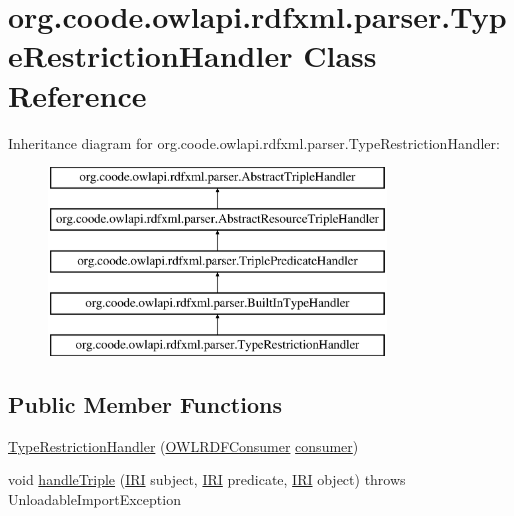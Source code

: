 \hypertarget{classorg_1_1coode_1_1owlapi_1_1rdfxml_1_1parser_1_1_type_restriction_handler}{\section{org.\-coode.\-owlapi.\-rdfxml.\-parser.\-Type\-Restriction\-Handler Class Reference}
\label{classorg_1_1coode_1_1owlapi_1_1rdfxml_1_1parser_1_1_type_restriction_handler}
}
Inheritance diagram for org.\-coode.\-owlapi.\-rdfxml.\-parser.\-Type\-Restriction\-Handler\-:\begin{figure}[H]
\begin{center}
\leavevmode
\includegraphics[height=5.000000cm]{classorg_1_1coode_1_1owlapi_1_1rdfxml_1_1parser_1_1_type_restriction_handler}
\end{center}
\end{figure}
\subsection*{Public Member Functions}
\begin{DoxyCompactItemize}
\item 
\hyperlink{classorg_1_1coode_1_1owlapi_1_1rdfxml_1_1parser_1_1_type_restriction_handler_a5f8f75bbf0d9b4a1b1745cfe0a914555}{Type\-Restriction\-Handler} (\hyperlink{classorg_1_1coode_1_1owlapi_1_1rdfxml_1_1parser_1_1_o_w_l_r_d_f_consumer}{O\-W\-L\-R\-D\-F\-Consumer} \hyperlink{classorg_1_1coode_1_1owlapi_1_1rdfxml_1_1parser_1_1_abstract_triple_handler_a4ccf4d898ff01eb1cadfa04b23d54e9c}{consumer})
\item 
void \hyperlink{classorg_1_1coode_1_1owlapi_1_1rdfxml_1_1parser_1_1_type_restriction_handler_a0329bf26bd475f41f5cbb73c424eeb34}{handle\-Triple} (\hyperlink{classorg_1_1semanticweb_1_1owlapi_1_1model_1_1_i_r_i}{I\-R\-I} subject, \hyperlink{classorg_1_1semanticweb_1_1owlapi_1_1model_1_1_i_r_i}{I\-R\-I} predicate, \hyperlink{classorg_1_1semanticweb_1_1owlapi_1_1model_1_1_i_r_i}{I\-R\-I} object)  throws Unloadable\-Import\-Exception 
\end{DoxyCompactItemize}
